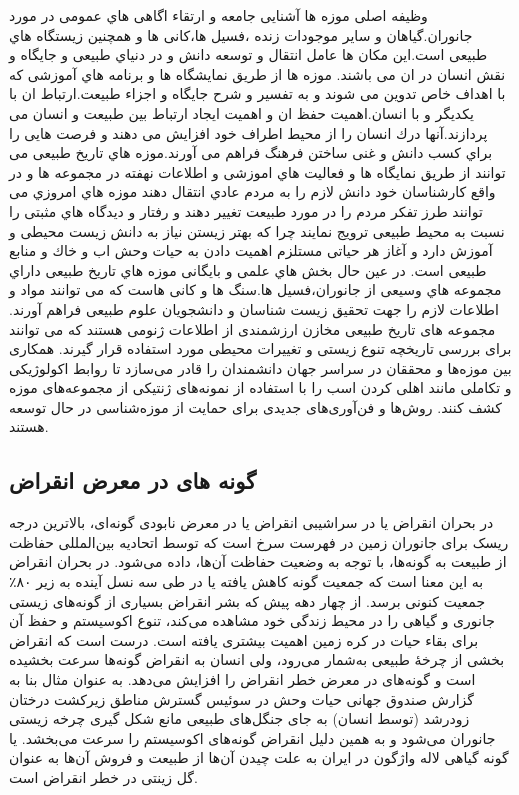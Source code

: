 وظیفه اصلی موزه ها آشنایی جامعه و ارتقاء اگاهی هاي عمومی در مورد جانوران.گیاهان و سایر موجودات زنده ،فسیل ها،کانی ها و همچنین  
زیستگاه هاي طبیعی است.این مکان ها عامل انتقال و توسعه دانش و در دنیاي طبیعی و جایگاه و نقش انسان در ان می باشند. موزه ها از طریق  
نمایشگاه ها و برنامه هاي آموزشی که با اهداف خاص تدوین می شوند و به تفسیر و شرح جایگاه و اجزاء طبیعت.ارتباط ان با یکدیگر و با انسان.اهمیت حفظ ان و اهمیت ایجاد ارتباط بین طبیعت و انسان می پردازند.آنها درك انسان را از محیط اطراف خود افزایش می دهند و فرصت هایی را براي کسب دانش و غنی ساختن فرهنگ فراهم می آورند.موزه هاي تاریخ طبیعی می توانند از طریق نمایگاه ها و فعالیت هاي اموزشی و اطلاعات نهفته در مجموعه ها و در واقع کارشناسان خود دانش لازم را به مردم عادي انتقال دهند موزه هاي امروزي می توانند طرز تفکر مردم را در  
مورد طبیعت تغییر دهند و رفتار و دیدگاه هاي مثبتی را نسبت به محیط طبیعی ترویج نمایند چرا که بهتر زیستن نیاز به دانش زیست محیطی و آموزش دارد و آغاز هر حیاتی مستلزم اهمیت دادن به حیات وحش اب و خاك و منابع طبیعی است. در عین حال بخش هاي علمی و بایگانی موزه هاي تاریخ طبیعی داراي مجموعه هاي وسیعی از جانوران،فسیل ها.سنگ ها و کانی هاست که می توانند مواد و اطلاعات لازم را جهت تحقیق  
زیست شناسان و دانشجویان علوم طبیعی فراهم آورند.
مجموعه های تاریخ طبیعی مخازن ارزشمندی از اطلاعات ژنومی هستند که می توانند برای بررسی تاریخچه تنوع زیستی و تغییرات محیطی مورد استفاده قرار گیرند. همکاری بین موزه‌ها و محققان در سراسر جهان دانشمندان را قادر می‌سازد تا روابط اکولوژیکی و تکاملی مانند اهلی کردن اسب را با استفاده از نمونه‌های ژنتیکی از مجموعه‌های موزه کشف کنند. روش‌ها و فن‌آوری‌های جدیدی برای حمایت از موزه‌شناسی در حال توسعه هستند.

\subsection{گونه های در معرض انقراض}
در بحران انقراض یا در سراشیبی انقراض یا در معرض نابودی گونه‌ای، بالاترین درجه ریسک برای جانوران زمین در فهرست سرخ  است که توسط اتحادیه بین‌المللی حفاظت از طبیعت به گونه‌ها، با توجه به وضعیت حفاظت آن‌ها، داده می‌شود. در بحران انقراض به این معنا است که جمعیت گونه کاهش یافته یا در طی سه نسل آینده به زیر ۸۰٪ جمعیت کنونی برسد.
از چهار دهه پیش که بشر انقراض بسیاری از گونه‌های زیستی جانوری و گیاهی را در محیط زندگی خود مشاهده می‌کند، تنوع اکوسیستم و حفظ آن برای بقاء حیات در کره زمین اهمیت بیشتری یافته است.
درست است که انقراض بخشی از چرخهٔ طبیعی به‌شمار می‌رود، ولی انسان به انقراض گونه‌ها سرعت بخشیده است و گونه‌های در معرض خطر انقراض را افزایش می‌دهد. به عنوان مثال بنا به گزارش صندوق جهانی حیات وحش در سوئیس گسترش مناطق زیرکشت درختان زودرشد (توسط انسان) به جای جنگل‌های طبیعی مانع شکل گیری چرخه زیستی جانوران می‌شود و به همین دلیل انقراض گونه‌های اکوسیستم را سرعت می‌بخشد.
 یا گونه گیاهی لاله واژگون در ایران به علت چیدن آن‌ها از طبیعت و فروش آن‌ها به عنوان گل زینتی در خطر انقراض است.

